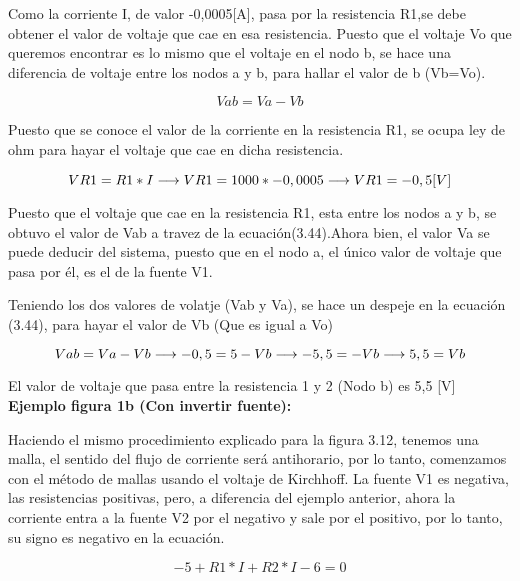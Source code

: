 \begin{example}
        Como la corriente I, de valor -0,0005[A], pasa por la resistencia R1,se debe obtener el valor de voltaje que cae en esa resistencia. Puesto que el voltaje Vo que queremos encontrar es lo mismo que el voltaje en el nodo b, se hace una diferencia de voltaje entre los nodos a y b, para hallar el valor de b (Vb=Vo).
        \begin{center}
            \begin{equation*}
            Vab=Va-Vb
            \end{equation*}
        \end{center}

        Puesto que se conoce el valor de la corriente en la resistencia R1, se ocupa ley de ohm para hayar el voltaje que cae en dicha resistencia.

        \begin{equation*}
        \notag
        VR1= R1*I
        \longrightarrow
        VR1=1000*-0,0005
        \longrightarrow
        VR1= -0,5[V]
        \end{equation*}

        \newpage
        Puesto que el voltaje que cae en la resistencia R1, esta entre los nodos a y b, se obtuvo el valor de Vab a travez de la ecuación(3.44).Ahora bien, el valor Va se puede deducir del sistema, puesto que en el nodo a, el único valor de voltaje que pasa por él, es el de la fuente V1.

        Teniendo los dos valores de volatje (Vab y Va), se hace un despeje en la ecuación (3.44), para hayar el valor de Vb (Que es igual a Vo)

        \begin{equation*}
        \notag
        Vab= Va-Vb
        \longrightarrow
        -0,5=5-Vb
        \longrightarrow
        -5,5=-Vb
        \longrightarrow
        5,5=Vb
        \end{equation*}

        El valor de voltaje que pasa entre la resistencia 1 y 2 (Nodo b) es 5,5 [V]
        \\
        \textbf{Ejemplo figura 1b (Con invertir fuente):}


        Haciendo el mismo procedimiento explicado para la figura 3.12, tenemos una malla, el sentido del flujo de corriente será antihorario, por lo tanto, comenzamos con el método de mallas usando el voltaje de Kirchhoff. La fuente V1 es negativa, las resistencias positivas, pero, a diferencia del ejemplo anterior, ahora la corriente entra a la fuente V2 por el negativo y sale por el positivo, por lo tanto, su signo es negativo en la ecuación.
        \begin{center}
            \begin{equation*}
            -5+R1*I + R2*I -6 =0
            \end{equation*}
        \end{center}


\end{example}
